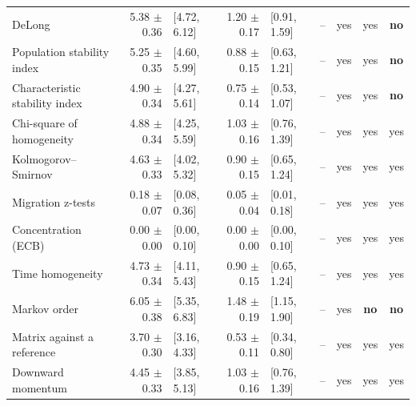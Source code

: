 {\begin{landscape}
\begin{table}[htbp]
{\begin{tabular}{lrlrlcccc}
DeLong & 5.38 $\pm$ 0.36 & [4.72, 6.12] & 1.20 $\pm$ 0.17 & [0.91, 1.59] & -- & yes & yes & \textbf{no} \\
Population stability index & 5.25 $\pm$ 0.35 & [4.60, 5.99] & 0.88 $\pm$ 0.15 & [0.63, 1.21] & -- & yes & yes & \textbf{no} \\
Characteristic stability index & 4.90 $\pm$ 0.34 & [4.27, 5.61] & 0.75 $\pm$ 0.14 & [0.53, 1.07] & -- & yes & yes & \textbf{no} \\
Chi-square of homogeneity & 4.88 $\pm$ 0.34 & [4.25, 5.59] & 1.03 $\pm$ 0.16 & [0.76, 1.39] & -- & yes & yes & yes \\
Kolmogorov--Smirnov & 4.63 $\pm$ 0.33 & [4.02, 5.32] & 0.90 $\pm$ 0.15 & [0.65, 1.24] & -- & yes & yes & yes \\
Migration z-tests & 0.18 $\pm$ 0.07 & [0.08, 0.36] & 0.05 $\pm$ 0.04 & [0.01, 0.18] & -- & yes & yes & yes \\
Concentration (ECB) & 0.00 $\pm$ 0.00 & [0.00, 0.10] & 0.00 $\pm$ 0.00 & [0.00, 0.10] & -- & yes & yes & yes \\
Time homogeneity & 4.73 $\pm$ 0.34 & [4.11, 5.43] & 0.90 $\pm$ 0.15 & [0.65, 1.24] & -- & yes & yes & yes \\
Markov order & 6.05 $\pm$ 0.38 & [5.35, 6.83] & 1.48 $\pm$ 0.19 & [1.15, 1.90] & -- & yes & \textbf{no} & \textbf{no} \\
Matrix against a reference & 3.70 $\pm$ 0.30 & [3.16, 4.33] & 0.53 $\pm$ 0.11 & [0.34, 0.80] & -- & yes & yes & yes \\
Downward momentum & 4.45 $\pm$ 0.33 & [3.85, 5.13] & 1.03 $\pm$ 0.16 & [0.76, 1.39] & -- & yes & yes & yes \\
\bottomrule
\end{tabular}}
\end{table}
\end{landscape}}

